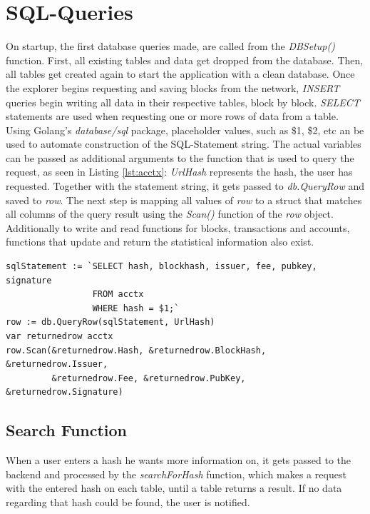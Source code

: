 \section{SQL-Queries} \label{sql}
On startup, the first database queries made, are called from the \emph{DBSetup()} function. First, all existing tables and data get dropped from the database. Then, all tables get created again to start the application with a clean database. Once the explorer begins requesting and saving blocks from the network, \emph{INSERT} queries begin writing all data in their respective tables, block by block. \emph{SELECT} statements are used when requesting one or more rows of data from a table. Using Golang's \emph{database/sql} package, placeholder values, such as \$1, \$2, etc an be used to automate construction of the SQL-Statement string. The actual variables can be passed as additional arguments to the function that is used to query the request, as seen in Listing \ref{lst:acctx}: \emph{UrlHash} represents the hash, the user has requested. Together with the statement string, it gets passed to \emph{db.QueryRow} and saved to \emph{row}. The next step is mapping all values of  \emph{row} to a struct that matches all columns of the query result using the \emph{Scan()} function of the \emph{row} object. Additionally to write and read functions for blocks, transactions and accounts, functions that update and return the statistical information also exist.
\\
\begin{lstlisting}[caption={Requesting a Specific Account Creation Transaction},captionpos=b,label={lst:acctx}]
sqlStatement := `SELECT hash, blockhash, issuer, fee, pubkey, signature 
				 FROM acctx 
				 WHERE hash = $1;`
row := db.QueryRow(sqlStatement, UrlHash)
var returnedrow acctx
row.Scan(&returnedrow.Hash, &returnedrow.BlockHash, &returnedrow.Issuer,
		 &returnedrow.Fee, &returnedrow.PubKey, &returnedrow.Signature)
\end{lstlisting}

\subsection{Search Function}
When a user enters a hash he wants more information on, it gets passed to the backend and processed by the \emph{searchForHash} function, which makes a request with the entered hash on each table, until a table returns a result. If no data regarding that hash could be found, the user is notified.

